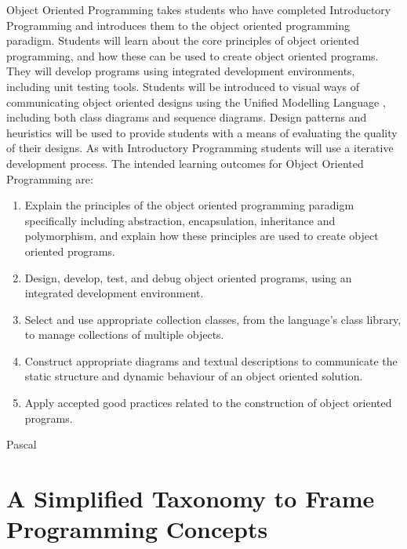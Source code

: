 Object Oriented Programming takes students who have completed Introductory Programming and introduces them to the object oriented programming paradigm. Students will learn about the core principles of object oriented programming, and how these can be used to create object oriented programs. They will develop programs using integrated development environments, including  unit testing tools. Students will be introduced to visual ways of communicating object oriented designs using the Unified Modelling Language \cite{Fowler:2004}, including both class diagrams and sequence diagrams. Design patterns and heuristics will be used to provide students with a means of evaluating the quality of their designs. As with Introductory Programming students will use a iterative development process. The intended learning outcomes for Object Oriented Programming are:
\begin{enumerate}
	\item Explain the principles of the object oriented programming paradigm specifically including abstraction, encapsulation, inheritance and polymorphism, and explain how these principles are used to create object oriented programs.
	\item Design, develop, test, and debug object oriented programs, using an integrated development environment.
	\item Select and use appropriate collection classes, from the language's class library, to manage collections of multiple objects.
	\item Construct appropriate diagrams and textual descriptions to communicate the static structure and dynamic behaviour of an object oriented solution.
	\item Apply accepted good practices related to the construction of object oriented programs.
\end{enumerate}


Pascal \cite{Becker:2002}




\section{A Simplified Taxonomy to Frame Programming Concepts} %
\label{sec:a_simplified_taxonomy_to_frame_programming_concepts}


